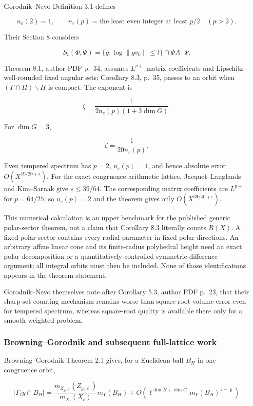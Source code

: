 Gorodnik--Nevo Definition 3.1 defines

\[
 n_e(2)=1,
 \qquad
 n_e(p)=\text{the least even integer at least }p/2\quad(p>2).
\]

Their Section 8 considers

\[
 S_t(\Phi,\Psi)
 =\{g:\log\|gv_0\|\leq t\}\cap\Phi A^+\Psi.
\]

Theorem 8.1, author PDF p.~34, assumes \(L^{p+}\) matrix coefficients and Lipschitz-well-rounded fixed angular sets; Corollary 8.3, p.~35, passes to an orbit when \((\Gamma\cap H)\backslash H\) is compact. The exponent is

\[
 \zeta=\frac{1}{2n_e(p)(1+3\dim G)}.
\]

For \(\dim G=3\),

\[
 \zeta=\frac1{20n_e(p)}.
\]

Even tempered spectrum has \(p=2\), \(n_e(p)=1\), and hence absolute error \(O(X^{19/20+\epsilon})\). For the exact congruence arithmetic lattice, Jacquet--Langlands and Kim--Sarnak give \(s\leq39/64\). The corresponding matrix coefficients are \(L^{p+}\) for \(p=64/25\), so \(n_e(p)=2\) and the theorem gives only \(O(X^{39/40+\epsilon})\).

This numerical calculation is an upper benchmark for the published generic polar-sector theorem, not a claim that Corollary 8.3 literally counts \(R(X)\). A fixed polar sector contains every radial parameter in fixed polar directions. An arbitrary affine linear cone and its finite-radius polyhedral height need an exact polar decomposition or a quantitatively controlled symmetric-difference argument; all integral orbits must then be included. None of those identifications appears in the theorem statement.

Gorodnik--Nevo themselves note after Corollary 5.3, author PDF p.~23, that their sharp-set counting mechanism remains worse than square-root volume error even for tempered spectrum, whereas square-root quality is available there only for a smooth weighted problem.

\subsubsection{Browning--Gorodnik and subsequent full-lattice work}\label{koide-lit-browninggorodnik-and-subsequent-full-lattice-work}

Browning--Gorodnik Theorem 2.1 gives, for a Euclidean ball \(B_H\) in one congruence orbit,

\[
 |\Gamma_\ell y\cap B_H|
 =\frac{m_{Z_{y,\ell}}(Z_{y,\ell})}{m_{X_\ell}(X_\ell)}m_Y(B_H)
 +O\!\left(\ell^{\dim H+\dim G}m_Y(B_H)^{1-\varrho}\right)
\]

